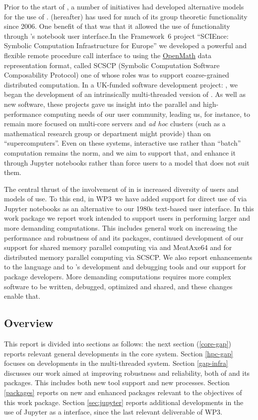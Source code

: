 \documentclass{deliverablereport}
\begin{document}
Prior to the start of \ODK, a number of initiatives had developed
alternative models for the use of \GAP. \SageMath (\Sage hereafter)
has used \GAP for much of its group theoretic functionality since
2006. One benefit of that was that it allowed the use of \GAP
functionality through \Sage's notebook user interface.In the Framework~6 project
``SCIEnce: Symbolic Computation Infrastructure for Europe'' we
developed a powerful and flexible remote procedure call interface to
\GAP using the \href{??}{OpenMath} data representation format, called
SCSCP (Symbolic Computation Software Composability Protocol) one of
whose roles was to support coarse-grained distributed computation. In
a UK-funded software development project: \HPCGAP, we began the
development of an intrinsically multi-threaded version of \GAP. As
well as new software, these projects gave us insight into the parallel
and high-performance computing needs of our user community, leading
us, for instance, to remain more focused on multi-core servers and
\textit{ad hoc} clusters (such as a mathematical research group or
department might provide) than on ``supercomputers''. Even on these
systems, interactive use rather than ``batch'' computation remains the
norm, and we aim to support that, and enhance it through Jupyter
notebooks rather than force users to a model that does not suit them.

The central thrust of the involvement of \GAP in \ODK is increased
diversity of users and models of use. To this end, in WP3~we have
added support for direct use of \GAP via Jupyter notebooks as an
alternative to our 1980s text-based user interface. In this work package we report
work intended to support \GAP users in performing larger and more
demanding computations. This includes general work on increasing the
performance and robustness of \GAP and its packages, continued
development of our support for shared memory parallel computing via
\HPCGAP and MeatAxe64 and for distributed memory parallel computing
via SCSCP. We also report enhancements to the \GAP language and to
\GAP's development and debugging tools and our support for package
developers. More demanding computations requires more complex software
to be written, debugged, optimized and shared, and these changes
enable that.

\subsection{Overview}
This report is divided into sections as follows: the next section (\ref{core-gap})
reports relevant general developments in the core \GAP system. Section
\ref{hpc-gap} focuses on developments in the multi-threaded
system. Section \ref{gap-infra} discusses our work aimed at improving
robustness and reliability, both of \GAP and its packages. This
includes both new tool support and new processes. Section
\ref{packages} reports on new and enhanced packages relevant to the
objectives of this work package.  Section \ref{sec:jupyter} reports
additional developments in the use of Jupyter as a \GAP interface,
since the last relevant deliverable of WP3.
\end{document}
